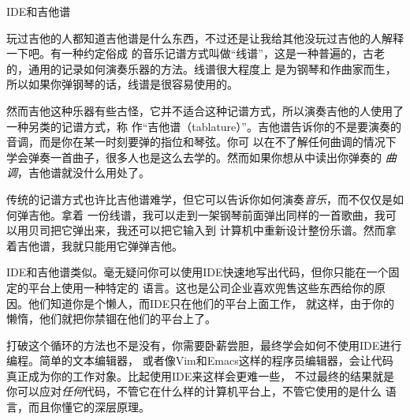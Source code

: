 \begin{aside}{IDE和吉他谱}

玩过吉他的人都知道吉他谱是什么东西，不过还是让我给其他没玩过吉他的人解释一下吧。有一种约定俗成
的音乐记谱方式叫做“线谱”，这是一种普遍的，古老的，通用的记录如何演奏乐器的方法。线谱很大程度上
是为钢琴和作曲家而生，所以如果你弹钢琴的话，线谱是很容易使用的。

然而吉他这种乐器有些古怪，它并不适合这种记谱方式，所以演奏吉他的人使用了一种另类的记谱方式，称
作“吉他谱（tablature）”。吉他谱告诉你的不是要演奏的音调，而是你在某一时刻要弹的指位和琴弦。你可
以在不了解任何曲调的情况下学会弹奏一首曲子，很多人也是这么去学的。然而如果你想从中读出你弹奏的
\emph{曲调}，吉他谱就没什么用处了。

传统的记谱方式也许比吉他谱难学，但它可以告诉你如何演奏\emph{音乐}，而不仅仅是如何弹吉他。拿着
一份线谱，我可以走到一架钢琴前面弹出同样的一首歌曲，我可以用贝司把它弹出来，我还可以把它输入到
计算机中重新设计整份乐谱。然而拿着吉他谱，我就只能用它弹弹吉他。

IDE和吉他谱类似。毫无疑问你可以使用IDE快速地写出代码，但你只能在一个固定的平台上使用一种特定的
语言。这也是公司企业喜欢兜售这些东西给你的原因。他们知道你是个懒人，而IDE只在他们的平台上面工作，
就这样，由于你的懒惰，他们就把你禁锢在他们的平台上了。

打破这个循环的方法也不是没有，你需要卧薪尝胆，最终学会如何不使用IDE进行编程。简单的文本编辑器，
或者像Vim和Emacs这样的程序员编辑器，会让代码真正成为你的工作对象。比起使用IDE来这样会更难一些，
不过最终的结果就是你可以应对\emph{任何}代码，不管它在什么样的计算机平台上，不管它使用的是什么
语言，而且你懂它的深层原理。

\end{aside}


